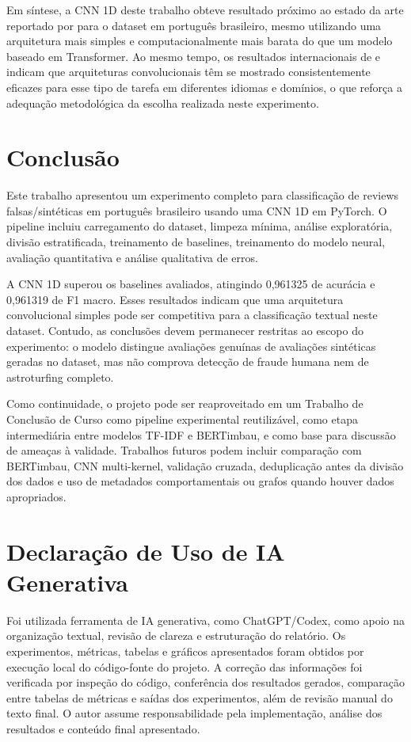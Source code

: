 \documentclass[12pt,a4paper]{article}
\begin{document}
Em síntese, a CNN 1D deste trabalho obteve resultado próximo ao estado da arte reportado por  para o dataset em português brasileiro, mesmo utilizando uma arquitetura mais simples e computacionalmente mais barata do que um modelo baseado em Transformer. Ao mesmo tempo, os resultados internacionais de  e  indicam que arquiteturas convolucionais têm se mostrado consistentemente eficazes para esse tipo de tarefa em diferentes idiomas e domínios, o que reforça a adequação metodológica da escolha realizada neste experimento.

\section{Conclusão}

Este trabalho apresentou um experimento completo para classificação de reviews falsas/sintéticas em português brasileiro usando uma CNN 1D em PyTorch. O pipeline incluiu carregamento do dataset, limpeza mínima, análise exploratória, divisão estratificada, treinamento de baselines, treinamento do modelo neural, avaliação quantitativa e análise qualitativa de erros.

A CNN 1D superou os baselines avaliados, atingindo 0,961325 de acurácia e 0,961319 de F1 macro. Esses resultados indicam que uma arquitetura convolucional simples pode ser competitiva para a classificação textual neste dataset. Contudo, as conclusões devem permanecer restritas ao escopo do experimento: o modelo distingue avaliações genuínas de avaliações sintéticas geradas no dataset, mas não comprova detecção de fraude humana nem de astroturfing completo.

Como continuidade, o projeto pode ser reaproveitado em um Trabalho de Conclusão de Curso como pipeline experimental reutilizável, como etapa intermediária entre modelos TF-IDF e BERTimbau, e como base para discussão de ameaças à validade. Trabalhos futuros podem incluir comparação com BERTimbau, CNN multi-kernel, validação cruzada, deduplicação antes da divisão dos dados e uso de metadados comportamentais ou grafos quando houver dados apropriados.

\section{Declaração de Uso de IA Generativa}

Foi utilizada ferramenta de IA generativa, como ChatGPT/Codex, como apoio na organização textual, revisão de clareza e estruturação do relatório. Os experimentos, métricas, tabelas e gráficos apresentados foram obtidos por execução local do código-fonte do projeto. A correção das informações foi verificada por inspeção do código, conferência dos resultados gerados, comparação entre tabelas de métricas e saídas dos experimentos, além de revisão manual do texto final. O autor assume responsabilidade pela implementação, análise dos resultados e conteúdo final apresentado.


\end{document}
